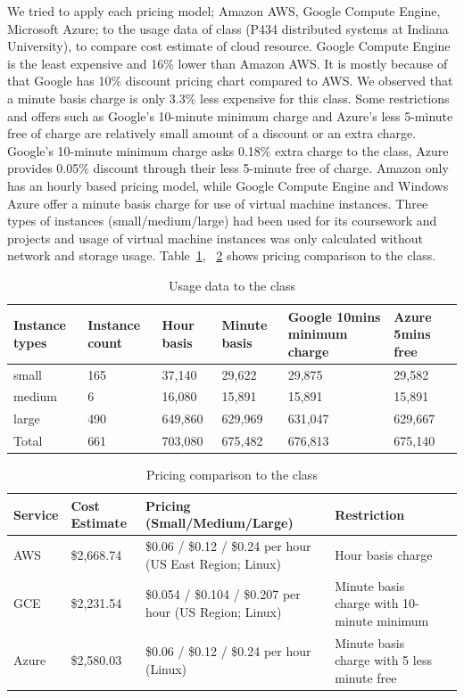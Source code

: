 \documentclass{sig-alternate}
\begin{document}
We tried to apply each pricing model; Amazon AWS, Google Compute Engine, Microsoft Azure; to the usage data of class (P434 distributed systems at Indiana University), to compare cost estimate of cloud resource. Google Compute Engine is the least expensive and 16\% lower than Amazon AWS. It is mostly because of that Google has 10\% discount pricing chart compared to AWS. We observed that a minute basis charge is only 3.3\% less expensive for this class. Some restrictions and offers such as Google's 10-minute minimum charge and Azure's less 5-minute free of charge are relatively small amount of a discount or an extra charge. Google's 10-minute minimum charge asks 0.18\% extra charge to the class, Azure provides 0.05\% discount through their less 5-minute free of charge. Amazon only has an hourly based pricing model, while Google Compute Engine and Windows Azure offer a minute basis charge for use of virtual machine instances. Three types of instances (small/medium/large) had been used for its coursework and projects and usage of virtual machine instances was only calculated without network and storage usage. Table~\ref{T:tab1}, ~\ref{T:tab2} shows pricing comparison to the class.

\begin{table}[h!]
\caption{Usage data to the class}\label{T:tab1}
\begin{tabular}{l|l|l|l|l|l}
Instance types & Instance count & Hour basis & Minute basis & Google 10mins minimum charge & Azure 5mins free \\
  \hline
small & 165 & 37,140 & 29,622 & 29,875 &29,582 \\
medium & 6 & 16,080 & 15,891 & 15,891 & 15,891 \\
large & 490 & 649,860 & 629,969 & 631,047 & 629,667 \\
  \hline \hline
Total & 661 & 703,080 & 675,482 & 676,813 & 675,140 \\
\end{tabular}
\end{table}


\begin{table}[h!]
\caption{Pricing comparison to the class}\label{T:tab2}
\begin{tabular}{l|l|l|l|l}
Service & Cost Estimate & Pricing (Small/Medium/Large) & Restriction \\
 \hline
AWS & \$2,668.74  & \$0.06 / \$0.12 / \$0.24 per hour (US East Region; Linux) & Hour basis charge\\
GCE & \$2,231.54  & \$0.054 / \$0.104 / \$0.207 per hour (US Region; Linux) & Minute basis charge with 10-minute minimum\\
Azure & \$2,580.03  & \$0.06 / \$0.12 / \$0.24 per hour (Linux) & Minute basis charge with 5 less minute free\\
\end{tabular}
\end{table}
\end{document}
